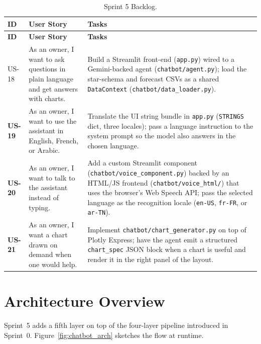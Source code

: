 \begin{longtable}{>{\bfseries}p{1.3cm} p{4.4cm} p{7cm}}
  \caption{Sprint 5 Backlog.\label{tab:sprint5_backlog}} \\
  \toprule
  \textbf{ID} & \textbf{User Story} & \textbf{Tasks} \\
  \midrule
  \endfirsthead
  \toprule
  \textbf{ID} & \textbf{User Story} & \textbf{Tasks} \\
  \midrule
  \endhead
  \bottomrule
  \endfoot

  US-18 & As an owner, I want to ask questions in plain language and get
          answers with charts.
        & Build a Streamlit front-end (\texttt{app.py}) wired to a Gemini-backed
          agent (\texttt{chatbot/agent.py}); load the star-schema and forecast
          CSVs as a shared \texttt{DataContext} (\texttt{chatbot/data\_loader.py}). \\[4pt]

  US-19 & As an owner, I want to use the assistant in English, French, or
          Arabic.
        & Translate the UI string bundle in \texttt{app.py} (\texttt{STRINGS}
          dict, three locales); pass a language instruction to the system
          prompt so the model also answers in the chosen language. \\[4pt]

  US-20 & As an owner, I want to talk to the assistant instead of typing.
        & Add a custom Streamlit component (\texttt{chatbot/voice\_component.py})
          backed by an HTML/JS frontend (\texttt{chatbot/voice\_html/}) that
          uses the browser's Web Speech API; pass the selected language as
          the recognition locale (\texttt{en-US}, \texttt{fr-FR}, or \texttt{ar-TN}). \\[4pt]

  US-21 & As an owner, I want a chart drawn on demand when one would help.
        & Implement \texttt{chatbot/chart\_generator.py} on top of Plotly
          Express; have the agent emit a structured \texttt{chart\_spec}
          JSON block when a chart is useful and render it in the right
          panel of the layout. \\
\end{longtable}

\section{Architecture Overview}

Sprint~5 adds a fifth layer on top of the four-layer pipeline introduced
in Sprint~0. Figure~\ref{fig:chatbot_arch} sketches the flow at runtime.

